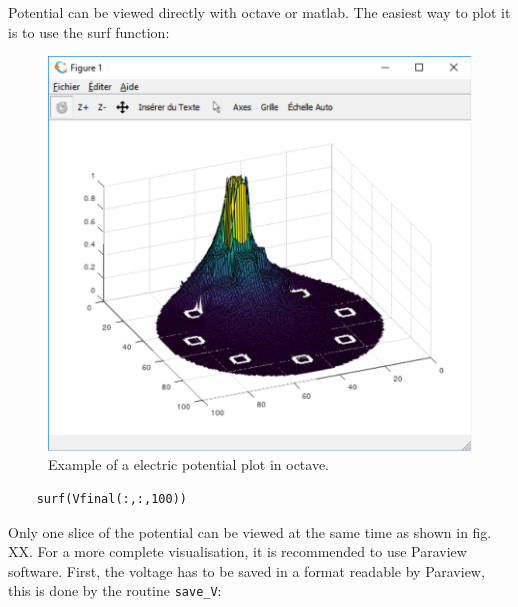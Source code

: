 \documentclass[10pt]{article}
\begin{document}
	Potential can be viewed directly with octave or matlab. The easiest way to plot it is to use the surf function:
	\begin{figure}[!htb]
		\centering
		\includegraphics[scale=0.6]{plot_V_octave.pdf}
		\caption{Example of a electric potential plot in octave. }   
		\label{fig:v_octave}
	\end{figure}
	
	\begin{lstlisting}
	surf(Vfinal(:,:,100))
	\end{lstlisting}
	Only one slice of the potential can be viewed at the same time as shown in fig. XX. For a more complete visualisation, it is recommended to use Paraview software.
	First, the voltage has to be saved in a format readable by Paraview, this is done by the routine \lstinline{save_V}:
	
\end{document}

